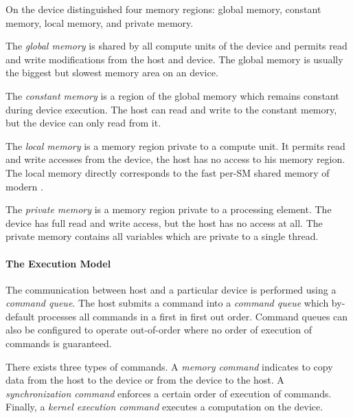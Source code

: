 On the device \OpenCL distinguished four memory regions:
global memory, constant memory, local memory, and private memory.

The \emph{global memory} is shared by all compute units of the device and permits read and write modifications from the host and device.
The global memory is usually the biggest but slowest memory area on an \OpenCL device.

The \emph{constant memory} is a region of the global memory which remains constant during device execution.
The host can read and write to the constant memory, but the device can only read from it.

The \emph{local memory} is a memory region private to a compute unit.
It permits read and write accesses from the device, the host has no access to his memory region.
The local memory directly corresponds to the fast per-SM shared memory of modern \GPUs.

The \emph{private memory} is a memory region private to a processing element.
The device has full read and write access, but the host has no access at all.
The private memory contains all variables which are private to a single thread.


\paragraph{The \OpenCL Execution Model}
The communication between host and a particular device is performed using a \emph{command queue}.
The host submits a command into a \emph{command queue} which by-default processes all commands in a first in first out order.
Command queues can also be configured to operate out-of-order where no order of execution of commands is guaranteed.

There exists three types of commands.
A \emph{memory command} indicates to copy data from the host to the device or from the device to the host.
A \emph{synchronization command} enforces a certain order of execution of commands.
Finally, a \emph{kernel execution command} executes a computation on the device.

